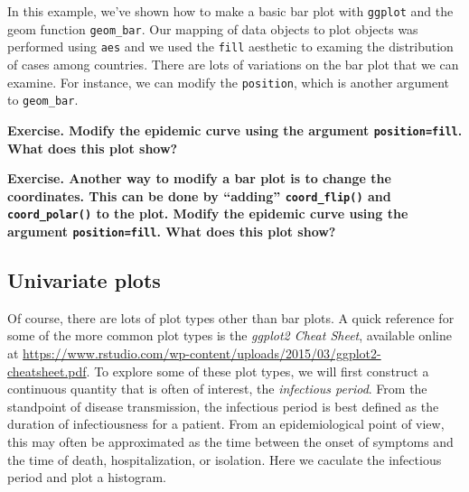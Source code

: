 \documentclass[]{article}
\newenvironment{Shaded}{\begin{snugshade}}{\end{snugshade}}
\newcommand{\KeywordTok}[1]{\textcolor[rgb]{0.13,0.29,0.53}{\textbf{#1}}}
\newcommand{\StringTok}[1]{\textcolor[rgb]{0.31,0.60,0.02}{#1}}
\newcommand{\CommentTok}[1]{\textcolor[rgb]{0.56,0.35,0.01}{\textit{#1}}}
\newcommand{\OperatorTok}[1]{\textcolor[rgb]{0.81,0.36,0.00}{\textbf{#1}}}
\newcommand{\NormalTok}[1]{#1}
\begin{document}
In this example, we've shown how to make a basic bar plot with
\texttt{ggplot} and the geom function \texttt{geom\_bar}. Our mapping of
data objects to plot objects was performed using \texttt{aes} and we
used the \texttt{fill} aesthetic to examing the distribution of cases
among countries. There are lots of variations on the bar plot that we
can examine. For instance, we can modify the \texttt{position}, which is
another argument to \texttt{geom\_bar}.

\textbf{Exercise. Modify the epidemic curve using the argument
\texttt{position=fill}. What does this plot show?}

\textbf{Exercise. Another way to modify a bar plot is to change the
coordinates. This can be done by ``adding'' \texttt{coord\_flip()} and
\texttt{coord\_polar()} to the plot. Modify the epidemic curve using the
argument \texttt{position=fill}. What does this plot show?}

\hypertarget{univariate-plots}{%
\subsection{Univariate plots}\label{univariate-plots}}

Of course, there are lots of plot types other than bar plots. A quick
reference for some of the more common plot types is the \emph{ggplot2
Cheat Sheet}, available online at
\url{https://www.rstudio.com/wp-content/uploads/2015/03/ggplot2-cheatsheet.pdf}.
To explore some of these plot types, we will first construct a
continuous quantity that is often of interest, the \emph{infectious
period}. From the standpoint of disease transmission, the infectious
period is best defined as the duration of infectiousness for a patient.
From an epidemiological point of view, this may often be approximated as
the time between the onset of symptoms and the time of death,
hospitalization, or isolation. Here we caculate the infectious period
and plot a histogram.

\begin{Shaded}
\end{Shaded}
\end{document}
